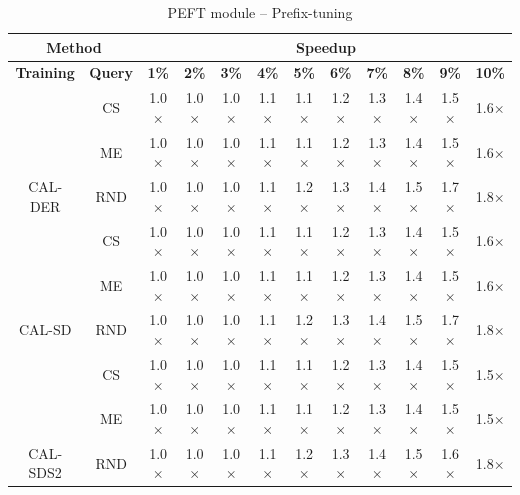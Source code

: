 \begin{table}[htbp]
\begin{subtable}{\linewidth}
\begin{tabular}{c|c|cccccccccc}
\toprule
\multicolumn{2}{c|}{\textbf{Method}} & \multicolumn{10}{c}{\textbf{Speedup}} \\
\midrule
\textbf{Training} & \textbf{Query} & \textbf{1\%} & \textbf{2\%} & \textbf{3\%} & \textbf{4\%} & \textbf{5\%} & \textbf{6\%} & \textbf{7\%} & \textbf{8\%} & \textbf{9\%} & \textbf{10\%}\\
\midrule
 & CS & 1.0$\times$ & 1.0$\times$ & 1.0$\times$ & 1.1$\times$ & 1.1$\times$ & 1.2$\times$ & 1.3$\times$ & 1.4$\times$ & 1.5$\times$ & 1.6$\times$\\

 & ME & 1.0$\times$ & 1.0$\times$ & 1.0$\times$ & 1.1$\times$ & 1.1$\times$ & 1.2$\times$ & 1.3$\times$ & 1.4$\times$ & 1.5$\times$ & 1.6$\times$\\

\multirow{-3}{*}{\raggedright\arraybackslash CAL-DER} & RND & 1.0$\times$ & 1.0$\times$ & 1.0$\times$ & 1.1$\times$ & 1.2$\times$ & 1.3$\times$ & 1.4$\times$ & 1.5$\times$ & 1.7$\times$ & 1.8$\times$\\
\midrule
 & CS & 1.0$\times$ & 1.0$\times$ & 1.0$\times$ & 1.1$\times$ & 1.1$\times$ & 1.2$\times$ & 1.3$\times$ & 1.4$\times$ & 1.5$\times$ & 1.6$\times$\\

 & ME & 1.0$\times$ & 1.0$\times$ & 1.0$\times$ & 1.1$\times$ & 1.1$\times$ & 1.2$\times$ & 1.3$\times$ & 1.4$\times$ & 1.5$\times$ & 1.6$\times$\\

\multirow{-3}{*}{\raggedright\arraybackslash CAL-SD} & RND & 1.0$\times$ & 1.0$\times$ & 1.0$\times$ & 1.1$\times$ & 1.2$\times$ & 1.3$\times$ & 1.4$\times$ & 1.5$\times$ & 1.7$\times$ & 1.8$\times$\\
\midrule
 & CS & 1.0$\times$ & 1.0$\times$ & 1.0$\times$ & 1.1$\times$ & 1.1$\times$ & 1.2$\times$ & 1.3$\times$ & 1.4$\times$ & 1.5$\times$ & 1.5$\times$\\

 & ME & 1.0$\times$ & 1.0$\times$ & 1.0$\times$ & 1.1$\times$ & 1.1$\times$ & 1.2$\times$ & 1.3$\times$ & 1.4$\times$ & 1.5$\times$ & 1.5$\times$\\

\multirow{-3}{*}{\raggedright\arraybackslash CAL-SDS2} & RND & 1.0$\times$ & 1.0$\times$ & 1.0$\times$ & 1.1$\times$ & 1.2$\times$ & 1.3$\times$ & 1.4$\times$ & 1.5$\times$ & 1.6$\times$ & 1.8$\times$\\
\bottomrule
\end{tabular}
\end{subtable}
\vspace{1em}
\begin{subtable}{\linewidth}
\centering
\caption{PEFT module -- Prefix-tuning}


\end{subtable}
\end{table}
